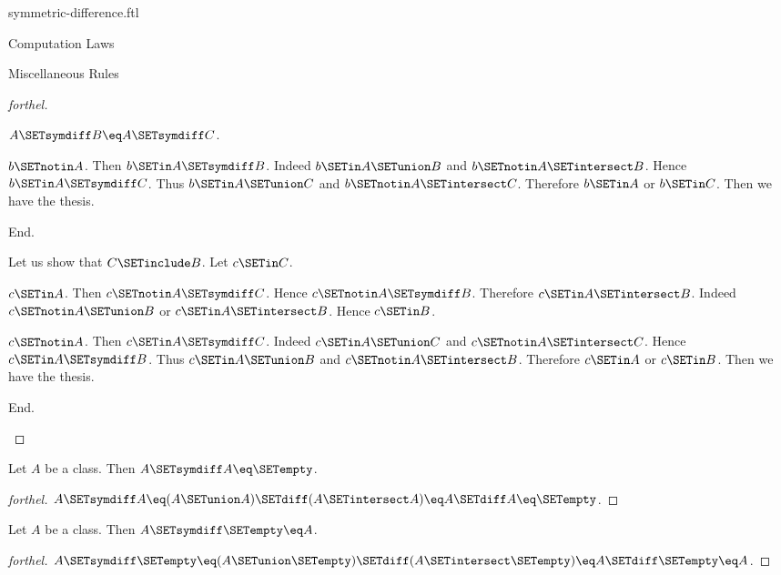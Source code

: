 \documentclass{stex}
\begin{document}
\begin{smodule}{symmetric-difference.ftl}
\begin{sfragment}{Computation Laws}
\begin{sfragment}{Miscellaneous Rules}
\begin{proof}[forthel]
\begin{case}{$A \SETsymdiff B \eq A \SETsymdiff C$.}
          \begin{case}{$b \SETnotin A$.}
            Then $b \SETin A \SETsymdiff B$.
            Indeed $b \SETin A \SETunion B$ and $b \SETnotin A \SETintersect B$.
            Hence $b \SETin A \SETsymdiff C$.
            Thus $b \SETin A \SETunion C$ and $b \SETnotin A \SETintersect C$.
            Therefore $b \SETin A$ or $b \SETin C$.
            Then we have the thesis.
          \end{case}
        End.

        Let us show that $C \SETinclude B$.
          Let $c \SETin C$.

          \begin{case}{$c \SETin A$.}
            Then $c \SETnotin A \SETsymdiff C$.
            Hence $c \SETnotin A \SETsymdiff B$.
            Therefore $c \SETin A \SETintersect B$.
            Indeed $c \SETnotin A \SETunion B$ or $c \SETin A \SETintersect B$.
            Hence $c \SETin B$.
          \end{case}

          \begin{case}{$c \SETnotin A$.}
            Then $c \SETin A \SETsymdiff C$.
            Indeed $c \SETin A \SETunion C$ and $c \SETnotin A \SETintersect C$.
            Hence $c \SETin A \SETsymdiff B$.
            Thus $c \SETin A \SETunion B$ and $c \SETnotin A \SETintersect B$.
            Therefore $c \SETin A$ or $c \SETin B$.
            Then we have the thesis.
          \end{case}
        End.
      \end{case}
    \end{proof}

    \begin{proposition}[forthel,id=FOUNDATIONS_03_4578696040022016]
      Let $A$ be a class.
      Then $A \SETsymdiff A \eq \SETempty$.
    \end{proposition}
    \begin{proof}[forthel]
      $A \SETsymdiff A
        \eq (A \SETunion A) \SETdiff (A \SETintersect A)
        \eq A \SETdiff A
        \eq \SETempty$.
    \end{proof}

    \begin{proposition}[forthel,id=FOUNDATIONS_03_6698730398941184]
      Let $A$ be a class.
      Then $A \SETsymdiff \SETempty \eq A$.
    \end{proposition}
    \begin{proof}[forthel]
      $A \SETsymdiff \SETempty
        \eq (A \SETunion \SETempty) \SETdiff (A \SETintersect \SETempty)
        \eq A \SETdiff \SETempty
        \eq A$.
    \end{proof}


\end{sfragment}
\end{sfragment}
\end{smodule}
\end{document}
